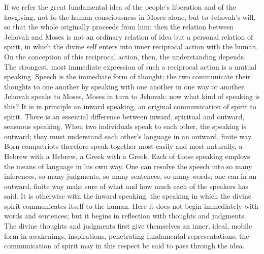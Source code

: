 \documentclass[12pt]{book}
\newcommand{\opage}[1]{\marginnote{\footnotesize\textit{[#1]}}}
\begin{document}
If we refer the great fundamental idea of the people's liberation and of
the lawgiving, not to the human consciousness in Moses alone, but to
Jehovah's will, so that the whole originally proceeds from him: then the
relation between Jehovah and Moses is not an ordinary relation of idea but
a personal relation of spirit, in which the divine self enters into inner
reciprocal action with the human. On the conception of this reciprocal
action, then, the understanding depends. The strongest, most immediate
expression of such a reciprocal action is a mutual speaking. Speech
is the immediate form of thought; the two communicate their thoughts to one
another by speaking with one another in one way or another. Jehovah speaks
to Moses, Moses in turn to Jehovah: now what kind of speaking is this? It
is in principle an inward speaking, an original communication of spirit to
spirit. There is an essential difference between inward, spiritual and
outward, sensuous speaking. When two individuals speak to each other, the
speaking is outward; they must understand each other's language in an
outward, finite way. Born compatriots therefore speak together most easily
and most naturally, a Hebrew with a Hebrew, a Greek with a Greek. Each of
those speaking employs the means of language in his own way. One can
resolve the speech into so many inferences, so many judgments, so many
sentences, so many words; one can in an outward, finite way make sure of
what and how much each of the speakers has said. It is otherwise with the
inward speaking, the
\opage{186}\setcounter{footnote}{0}%
speaking in which the divine spirit communicates itself to the human. Here
it does not begin immediately with words and sentences; but it begins in
reflection with thoughts and judgments. The divine thoughts and judgments
first give themselves an inner, ideal, mobile form in awakenings,
inspirations, penetrating fundamental representations; the communication
of spirit may in this respect be said to pass through the idea.
\end{document}
